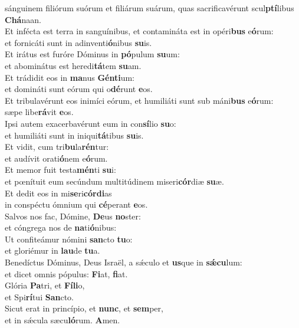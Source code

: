 \evenverse sánguinem filiórum suórum et filiárum suárum, quas sacrificavérunt scul\textbf{ptí}libus \textbf{Chá}naan.\\
\oddverse Et infécta est terra in sanguínibus, et contamináta est in opéri\textbf{bus} e\textbf{ó}rum:~\*\\
\oddverse et fornicáti sunt in adinventi\textbf{ó}nibus \textbf{su}is.\\
\evenverse Et irátus est furóre Dóminus in \textbf{pó}pulum \textbf{su}um:~\*\\
\evenverse et abominátus est heredi\textbf{tá}tem \textbf{su}am.\\
\oddverse Et trádidit eos in \textbf{ma}nus \textbf{Gén}\textbf{ti}um:~\*\\
\oddverse et domináti sunt eórum qui o\textbf{dé}runt \textbf{e}os.\\
\evenverse Et tribulavérunt eos inimíci eórum, et humiliáti sunt sub máni\textbf{bus} e\textbf{ó}rum:~\*\\
\evenverse sæpe libe\textbf{rá}vit \textbf{e}os.\\
\oddverse Ipsi autem exacerbavérunt eum in con\textbf{sí}lio \textbf{su}o:~\*\\
\oddverse et humiliáti sunt in iniqui\textbf{tá}tibus \textbf{su}is.\\
\evenverse Et vidit, cum tri\textbf{bu}la\textbf{rén}tur:~\*\\
\evenverse et audívit orati\textbf{ó}nem e\textbf{ó}rum.\\
\oddverse Et memor fuit testa\textbf{mén}ti \textbf{su}i:~\*\\
\oddverse et pœnítuit eum secúndum multitúdinem miseri\textbf{cór}diæ \textbf{su}æ.\\
\evenverse Et dedit eos in mi\textbf{se}ri\textbf{cór}\textbf{di}as~\*\\
\evenverse in conspéctu ómnium qui \textbf{cé}perant \textbf{e}os.\\
\oddverse Salvos nos fac, Dómine, \textbf{De}us \textbf{no}ster:~\*\\
\oddverse et cóngrega nos de \textbf{na}ti\textbf{ó}nibus:\\
\evenverse Ut confiteámur nómini \textbf{san}cto \textbf{tu}o:~\*\\
\evenverse et gloriémur in \textbf{lau}de \textbf{tu}a.\\
\oddverse Benedíctus Dóminus, Deus Israël, a sǽculo et \textbf{us}que in \textbf{sǽ}\textbf{cu}lum:~\*\\
\oddverse et dicet omnis pópulus: \textbf{Fi}at, \textbf{fi}at.\\
\evenverse Glória \textbf{Pa}tri, et \textbf{Fí}\textbf{li}o,~\*\\
\evenverse et Spi\textbf{rí}tui \textbf{San}cto.\\
\oddverse Sicut erat in princípio, et \textbf{nunc}, et \textbf{sem}per,~\*\\
\oddverse et in sǽcula sæcu\textbf{ló}rum. \textbf{A}men.\\
